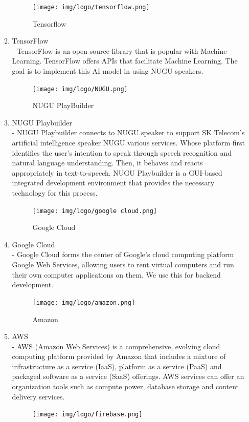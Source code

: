 \documentclass[conference]{IEEEtran}
\begin{document}
\begin{enumerate}
\begin{enumerate}
\begin{figure}[h!]
            \centerline{\texttt{[image: img/logo/tensorflow.png]}}
            \caption{Tensorflow}
        \end{figure}
        \item TensorFlow\\
        - TensorFlow is an open-source library that is popular with Machine Learning. TensorFlow offers APIs that facilitate Machine Learning. The goal is to implement this AI model in using NUGU speakers.
         \begin{figure}[h!]
            \centerline{\texttt{[image: img/logo/NUGU.png]}}
            \caption{NUGU PlayBuilder}
        \end{figure}
        \item NUGU Playbuilder\\
        - NUGU Playbuilder connects to NUGU speaker to support SK Telecom's artificial intelligence speaker NUGU various services. Whose platform first identifies the user's intention to speak through speech recognition and natural language understanding. Then, it behaves and reacts appropriately in text-to-speech. NUGU Playbuilder is a GUI-based integrated development environment that provides the necessary technology for this process.
         \begin{figure}[h!]
            \centerline{\texttt{[image: img/logo/google cloud.png]}}
            \caption{Google Cloud}
        \end{figure}
        \item Google Cloud\\
        - Google Cloud forms the center of Google’s cloud computing platform Google Web Services, allowing users to rent virtual computers and run their own computer applications on them. We use this for backend development.
        \begin{figure}[h!]
            \centerline{\texttt{[image: img/logo/amazon.png]}}
            \caption{Amazon}
        \end{figure}
        \item AWS\\
        - AWS (Amazon Web Services) is a comprehensive, evolving cloud computing platform provided by Amazon that includes a mixture of infrastructure as a service (IaaS), platform as a service (PaaS) and packaged software as a service (SaaS) offerings. AWS services can offer an organization tools such as compute power, database storage and content delivery services.
         \begin{figure}[h!]
            \centerline{\texttt{[image: img/logo/firebase.png]}}

\end{figure}
\end{enumerate}
\end{enumerate}
\end{document}
